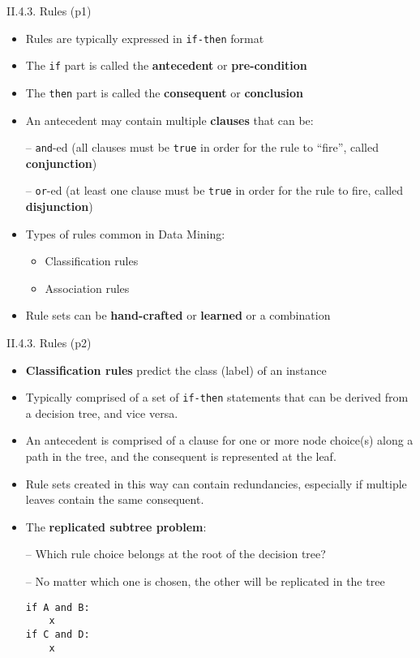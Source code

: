 \documentclass[handout]{beamer}
\newcommand{\strong}[1]{\textbf{\color{teal} #1}}
\begin{document}
\begin{frame}{II.4.3. Rules (p1)}
\begin{itemize}
\item Rules are typically expressed in \lstinline+if-then+ format
\item The \lstinline+if+ part is called the \strong{antecedent} or \strong{pre-condition}
\item The \lstinline+then+ part is called the \strong{consequent} or \strong{conclusion}
\item An antecedent may contain multiple \strong{clauses} that can be:
\item[--] \lstinline+and+-ed (all clauses must be \lstinline+true+ in order for the rule to ``fire'', called \strong{conjunction})
\item[--] \lstinline+or+-ed (at least one clause must be \lstinline+true+ in order for the rule to fire, called \strong{disjunction})
\item Types of rules common in Data Mining:
	\begin{itemize}
    \item Classification rules
    \item Association rules
	\end{itemize}
\item Rule sets can be \strong{hand-crafted} or \strong{learned} or a combination
\end{itemize}
\end{frame}
\begin{frame}[fragile]{II.4.3. Rules (p2)}
\begin{itemize}
\item \strong{Classification rules} predict the class (label) of an instance
\item Typically comprised of a set of \lstinline+if-then+ statements that can be derived from a decision tree, and vice versa.
\item An antecedent is comprised of a clause for one or more node choice(s) along a path in the tree, and the consequent is represented at the leaf.
\item Rule sets created in this way can contain redundancies, especially if multiple leaves contain the same consequent.
\item The \strong{replicated subtree problem}:
\item[--] Which rule choice belongs at the root of the decision tree?
\item[--] No matter which one is chosen, the other will be replicated in the tree
\begin{lstlisting}[numbers=none]
if A and B:
	x
if C and D:
	x
\end{lstlisting}
\end{itemize}
\end{frame}
\end{document}
